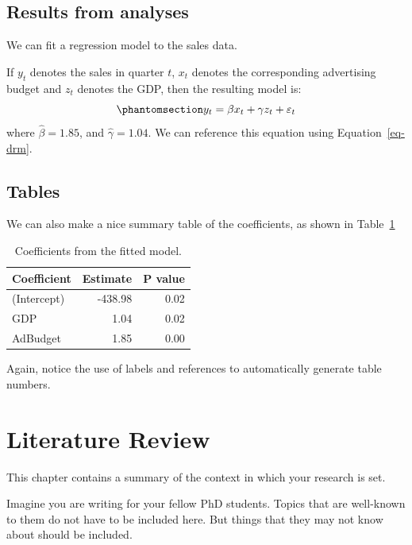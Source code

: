 \documentclass[
  11pt,
  a4paper,
  nottoc]{report}
\begin{document}
\section{Results from analyses}\label{results-from-analyses}

We can fit a regression model to the sales data.

If \(y_t\) denotes the sales in quarter \(t\), \(x_t\) denotes the
corresponding advertising budget and \(z_t\) denotes the GDP, then the
resulting model is: \begin{equation}\phantomsection\label{eq-drm}{
  y_t = \beta x_t + \gamma z_t + \varepsilon_t
}\end{equation} where \(\hat{\beta} = 1.85\), and
\(\hat{\gamma} = 1.04\). We can reference this equation using
Equation~\ref{eq-drm}.

\section{Tables}\label{tables}

We can also make a nice summary table of the coefficients, as shown in
Table~\ref{tbl-coef}

\begin{longtable}[]{@{}lrr@{}}

\caption{\label{tbl-coef}Coefficients from the fitted model.}

\tabularnewline

\toprule\noalign{}
Coefficient & Estimate & P value \\
\midrule\noalign{}
\endhead
\bottomrule\noalign{}
\endlastfoot
(Intercept) & -438.98 & 0.02 \\
GDP & 1.04 & 0.02 \\
AdBudget & 1.85 & 0.00 \\

\end{longtable}

Again, notice the use of labels and references to automatically generate
table numbers.


\chapter{Literature Review}\label{sec-litreview}

This chapter contains a summary of the context in which your research is
set.

Imagine you are writing for your fellow PhD students. Topics that are
well-known to them do not have to be included here. But things that they
may not know about should be included.
\end{document}
